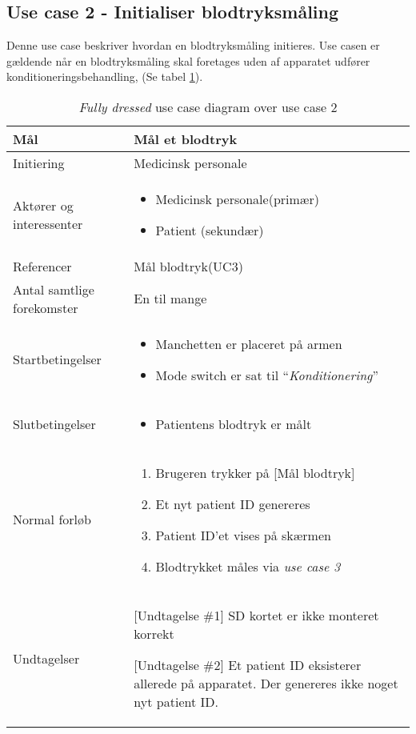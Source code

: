 	\subsection{Use case 2 - Initialiser blodtryksmåling }
	Denne use case beskriver hvordan en blodtryksmåling initieres. Use casen er gældende når en blodtryksmåling skal foretages uden af apparatet udfører konditioneringsbehandling, (Se tabel \ref{tab:uc2}).
	\begin{table}[H]
		\begin{center}
			\begin{tabular}{ | p{} | p{}| } 
				\hline
				Mål& Mål et blodtryk\\ 
				\hline
				Initiering &  Medicinsk personale\\
				\hline
				Aktører og interessenter & 
				\begin{itemize}
					\item Medicinsk personale(primær)
					\item Patient (sekundær)
				\end{itemize} \\ 
				\hline
				Referencer & Mål blodtryk(UC3) \\ 
				\hline
				Antal samtlige forekomster & En til mange\\ 
				\hline	
				Startbetingelser & 
				\begin{itemize}
					\item Manchetten er placeret på armen
					\item Mode switch er sat til “\textit{Konditionering}”
				\end{itemize} \\ 
				\hline
				Slutbetingelser & 
				\begin{itemize}
					\item Patientens blodtryk er målt
				\end{itemize} \\ 
				\hline
				Normal forløb & \begin{enumerate}
					\setlength\itemsep{0cm} %
					\item Brugeren trykker på [Mål blodtryk]
					\subitem [Undtagelse \#1]
					\item Et nyt patient ID genereres
					\subitem [Undtagelse \#2] 
					\item Patient ID’et vises på skærmen
					\item Blodtrykket måles via \textit{use case 3}
					
				\end{enumerate} \\ 
				\hline
				Undtagelser & [Undtagelse \#1] SD kortet er ikke monteret korrekt
				
				[Undtagelse \#2] Et patient ID eksisterer allerede på apparatet. Der genereres ikke noget nyt patient ID. \\ 
				\hline
				
			\end{tabular}
		\end{center}
		\caption{\textit{Fully dressed} use case diagram over use case 2} \label{tab:uc2}
			\end{table}
		\newpage